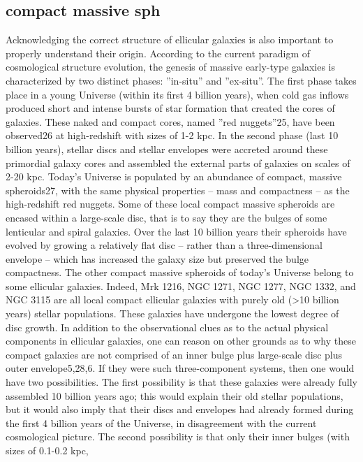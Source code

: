 \documentclass[useAMS,usenatbib,article]{mn2e}
\begin{document}
\subsection{compact massive sph}
Acknowledging the correct structure of ellicular galaxies is also important to properly understand their origin. 
According to the current paradigm of cosmological structure evolution, 
the genesis of massive early-type galaxies is characterized by two distinct phases: ''in-situ'' and ''ex-situ''. 
The first phase takes place in a young Universe (within its first 4 billion years), 
when cold gas inflows produced short and intense bursts of star formation that created the cores of galaxies. 
These naked and compact cores, named ''red nuggets''25, have been observed26 at high-redshift with sizes of 1-2 kpc.
In the second phase (last 10 billion years), stellar discs and stellar envelopes 
were accreted around these primordial galaxy cores and assembled the external parts of galaxies on scales of 2-20 kpc. 
Today's Universe is populated by an abundance of compact, massive spheroids27, 
with the same physical properties -- mass and compactness -- as the high-redshift red nuggets. 
Some of these local compact massive spheroids are encased within a large-scale disc, 
that is to say they are the bulges of some lenticular and spiral galaxies. 
Over the last 10 billion years their spheroids have evolved by growing a relatively flat disc -- 
rather than a three-dimensional envelope -- 
which has increased the galaxy size but preserved the bulge compactness. 
The other compact massive spheroids of today's Universe belong to some ellicular galaxies. 
Indeed, Mrk 1216, NGC 1271, NGC 1277, NGC 1332, and NGC 3115 are all local compact ellicular galaxies 
with purely old (>10 billion years) stellar populations. 
These galaxies have undergone the lowest degree of disc growth.
In addition to the observational clues as to the actual physical components in ellicular galaxies, 
one can reason on other grounds as to why these compact galaxies are not comprised of an inner bulge 
plus large-scale disc plus outer envelope5,28,6. If they were such three-component systems, 
then one would have two possibilities. 
The first possibility is that these galaxies were already fully assembled 10 billion years ago; 
this would explain their old stellar populations, 
but it would also imply that their discs and envelopes had already formed during the first 4 billion years of the Universe, 
in disagreement with the current cosmological picture. 
The second possibility is that only their inner bulges (with sizes of 0.1-0.2 kpc, 
\end{document}
